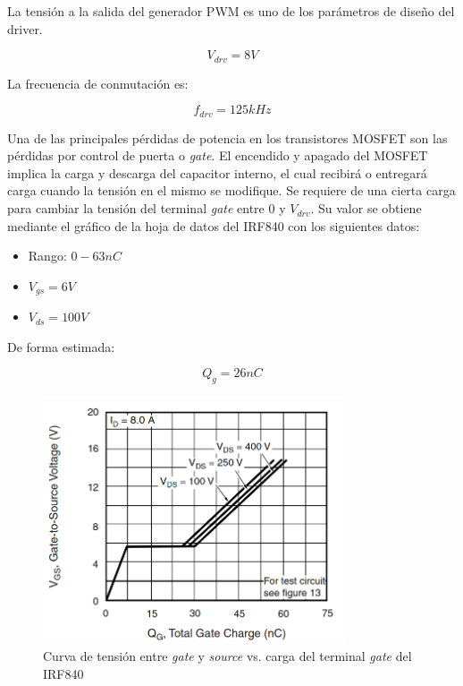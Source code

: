 La tensión a la salida del generador PWM es uno de los parámetros de diseño del driver.

$$ V_{drv}=8V $$

La frecuencia de conmutación es: 

$$ f_{drv}=125kHz $$


Una de las principales pérdidas de potencia en los transistores MOSFET son las pérdidas por control de puerta o \textit{gate}. 
El encendido y apagado del MOSFET implica la carga y descarga del capacitor interno, 
el cual recibirá o entregará carga cuando la tensión en el mismo se modifique. 
Se requiere de una cierta carga para cambiar la tensión del terminal \textit{gate} entre $0$ y $V_{drv}$. 
Su valor se obtiene mediante el gráfico de la hoja de datos del IRF840 con los siguientes datos:

\begin{itemize}
    \item Rango: $0-63nC$
    \item $V_{gs}=6V$
    \item $V_{ds}=100V$
\end{itemize}

De forma estimada: 

$$ Q_g=26nC $$

\begin{figure}[ht]
    \centering
    \includegraphics[width=0.8\textwidth]{images/irf840/vgs-vs-qg.png}
    \caption{Curva de tensión entre \textit{gate} y \textit{source} vs. carga del terminal \textit{gate} del IRF840}
    \label{fig:vgs-vs-qg}
\end{figure}

